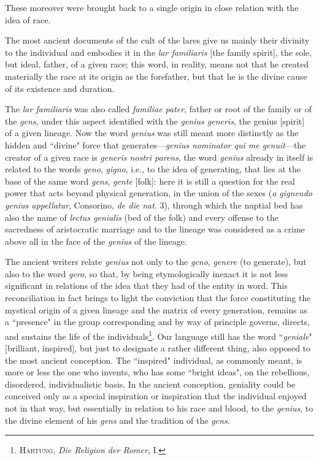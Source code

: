 These moreover were brought back to a single origin in close relation with the idea of race.

\begin{quotex}
The most ancient documents of the cult of the lares give us mainly their divinity to the individual and embodies it in the \emph{lar familiaris} [the family spirit], the sole, but ideal, father, of a given race; this word, in reality, means not that he created materially the race at its origin as the forefather, but that he is the divine cause of its existence and duration. 
\end{quotex}

The \emph{lar familiaris} was also called \emph{familiae pater}, father or root of the family or of the \emph{gens}, under this aspect identified with the \emph{genius generis}, the genius [spirit] of a given lineage. Now the word \emph{genius} was still meant more distinctly as the hidden and ``divine" force that generates—\emph{genius nominator qui me genuit}—the creator of a given race is \emph{generis nostri parens}, the word \emph{genius} already in itself is related to the words \emph{geno}, \emph{gigno}, i.e., to the idea of generating, that lies at the base of the same word \emph{gens}, \emph{gente} [folk]: here it is still a question for the real power that acts beyond physical generation, in the union of the sexes (\emph{a gignendo genius appellatur}, Consorino, \emph{de die nat}. 3), through which the nuptial bed has also the name of \emph{lectus genialis} (bed of the folk) and every offense to the sacredness of aristocratic marriage and to the lineage was considered as a crime above all in the face of the \emph{genius} of the lineage.

The ancient writers relate \emph{genius} not only to the \emph{geno}, \emph{genere} (to generate), but also to the word \emph{gero}, so that, by being etymologically inexact it is not less significant in relations of the idea that they had of the entity in word. This reconciliation in fact brings to light the conviction that the force constituting the mystical origin of a given lineage and the matrix of every generation, remains as a ``presence" in the group corresponding and by way of principle governs, directs, and sustains the life of the individuals\footnote{\textsc{Hartung}, \emph{Die Religion der Romer}, I.}. Our language still has the word ``\emph{geniale}" [brilliant, inspired], but just to designate a rather different thing, also opposed to the most ancient conception. The ``inspired" individual, as commonly meant, is more or less the one who invents, who has some ``bright ideas", on the rebellious, disordered, individualistic basis. In the ancient conception, geniality could be conceived only as a special inspiration or inspiration that the individual enjoyed not in that way, but essentially in relation to his race and blood, to the \emph{genius}, to the divine element of his \emph{gens} and the tradition of the \emph{gens}.



